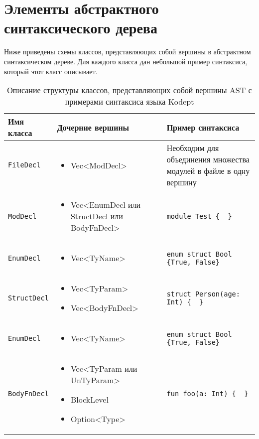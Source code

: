 \section*{Элементы абстрактного синтаксического дерева}

Ниже приведены схемы классов, представляющих собой вершины в абстрактном синтаксическом дереве.
Для каждого класса дан небольшой пример синтаксиса, который этот класс описывает.

\begin{table}[H]
    \centering
    \caption{Описание структуры классов, представляющих собой вершины AST с примерами синтаксиса языка Kodept}
    \label{tab:nodes_ast}
    \begin{tabular}{|p{}|p{}|p{}|}
        \hline
        \textbf{Имя \newline класса} & \textbf{Дочерние вершины} & \textbf{Пример синтаксиса} \\\hline
        \texttt{FileDecl} & \begin{itemize} \item Vec<ModDecl> \end{itemize} & Необходим для объединения множества модулей в файле в одну вершину \\\hline
        \texttt{ModDecl} & \begin{itemize} \item Vec<EnumDecl или StructDecl или BodyFnDecl> \end{itemize} & \verb|module Test {  }| \\\hline
        \texttt{EnumDecl} & \begin{itemize} \item Vec<TyName> \end{itemize} & \verb|enum struct Bool {True, False}| \\\hline
        \texttt{StructDecl} & \begin{itemize} \item Vec<TyParam> \item Vec<BodyFnDecl> \end{itemize} & \verb|struct Person(age: Int) {  }| \\\hline
        \texttt{EnumDecl} & \begin{itemize} \item Vec<TyName> \end{itemize} & \verb|enum struct Bool {True, False}| \\\hline
        \texttt{BodyFnDecl} & \begin{itemize} \item Vec<TyParam или UnTyParam> \item BlockLevel \item Option<Type> \end{itemize} & \verb|fun foo(a: Int) {  }| \\\hline

\end{tabular}
\end{table}
